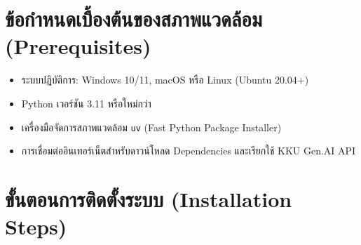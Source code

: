 
\setcounter{chapter}{-1}

\section*{ข้อกำหนดเบื้องต้นของสภาพแวดล้อม (Prerequisites)}

\begin{itemize}
    \item ระบบปฏิบัติการ: Windows 10/11, macOS หรือ Linux (Ubuntu 20.04+)
    \item Python เวอร์ชัน 3.11 หรือใหม่กว่า
    \item เครื่องมือจัดการสภาพแวดล้อม \texttt{uv} (Fast Python Package Installer)
    \item การเชื่อมต่ออินเทอร์เน็ตสำหรับดาวน์โหลด Dependencies และเรียกใช้ KKU Gen.AI API
\end{itemize}

\section*{ขั้นตอนการติดตั้งระบบ (Installation Steps)}


